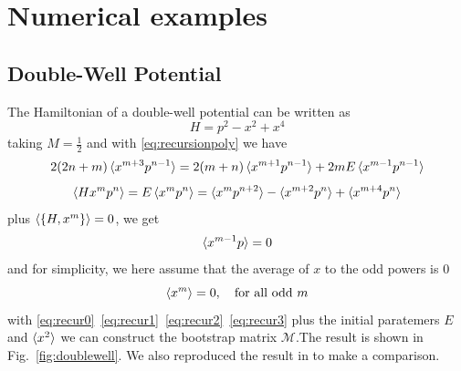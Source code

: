 \documentclass[aps, preprint,amsmath, amssymb]{revtex4-2}
\begin{document}
\section{Numerical examples}
\subsection {Double-Well Potential}
The Hamiltonian of a double-well potential can be written as
\begin{equation}
	H = p^2 - x^2 + x^4
\end{equation}
taking $M = \frac12$ and with \eqref{eq:recursionpoly} we have
\begin{equation}
	2(2n + m)\braket{x^{m + 3} p^{n - 1}} = 2(m + n)\braket{x^{m + 1} p^{n - 1}} + 2mE\braket{x^{m - 1} p^{n - 1}} \label{eq:recur0}
\end{equation}
\begin{equation}
	\braket{Hx^m p^n} = E\braket{x^m p^n} = \braket{x^m p^{n + 2}} - \braket{x^{m + 2} p^n} + \braket{x^{m + 4} p^n} \label{eq:recur1}
\end{equation}
plus $\braket{\{H, x^m\}} = 0$, we get
\begin{equation}
	\braket{x^{m - 1} p} = 0 \label{eq:recur2}
\end{equation}
and for simplicity, we here assume that the average of $x$ to the odd powers is $0$
\begin{equation}
	\braket{x^m} = 0,\ \ \ \text{for all odd}\ m \label{eq:recur3}
\end{equation}
with \eqref{eq:recur0}~\eqref{eq:recur1}~\eqref{eq:recur2}~\eqref{eq:recur3} plus the initial paratemers $E$ and $\braket{x^2}$ we can construct the bootstrap matrix $\bm{\mathcal{M}}$.The result is shown in Fig.~\ref{fig:doublewell}. We also reproduced the result in \cite{Nakayama_2022} to make a comparison.
\end{document}
